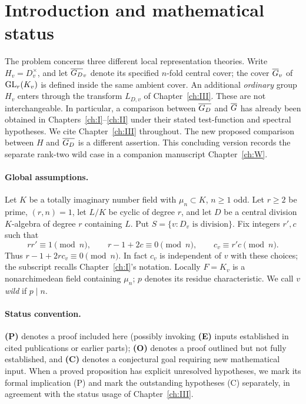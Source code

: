 \section{Introduction and mathematical status}\label{IV:sec:intro}
The problem concerns three different local representation theories.
Write $H_v=D_v^\times$, and let $\overline{G_D}_v$ denote its specified $n$-fold
central cover; the cover $\overline G_v$ of $\operatorname{GL}_r(K_v)$ is defined inside the
same ambient cover.  An additional \emph{ordinary} group $H_v$ enters
through the transform $L_{D,v}$ of Chapter~\ref{ch:III}.  These are not interchangeable.
In particular, a comparison between $\overline{G_D}$ and $\overline G$ has already been
obtained in Chapters~\ref{ch:I}--\ref{ch:II} under their
stated test-function and spectral hypotheses.  We cite Chapter~\ref{ch:III} throughout.  The new proposed comparison between $H$ and $\overline{G_D}$ is a
different assertion.  This concluding version records the separate
rank-two wild case in a companion manuscript Chapter~\ref{ch:W}.

\paragraph{Global assumptions.}
Let $K$ be a totally imaginary number field with $\mu_n\subset K$,
$n\geq1$ odd.  Let $r\geq2$ be prime, $(r,n)=1$, let $L/K$ be cyclic
of degree $r$, and let $D$ be a central division $K$-algebra of
degree $r$ containing $L$.  Put $S=\{v:D_v\text{ is division}\}$.
Fix integers $r',c$ such that
\begin{equation}\label{IV:eq:parameters}
 rr'\equiv1\pmod n,\qquad r-1+2c\equiv0\pmod n,
 \qquad c_v\equiv r'c\pmod n.
\end{equation}
Thus $r-1+2rc_v\equiv0\pmod n$.  In fact $c_v$ is independent
of $v$ with these choices; the subscript recalls Chapter~\ref{ch:I}'s notation.
Locally $F=K_v$ is a nonarchimedean field containing $\mu_n$;
$p$ denotes its residue characteristic.  We call $v$ \emph{wild}
if $p\mid n$.

\paragraph{Status convention.}
\textbf{(P)} denotes a proof included here (possibly invoking
\textbf{(E)} inputs established in cited publications or earlier parts);
\textbf{(O)} denotes a proof outlined but not fully established, and
\textbf{(C)} denotes a conjectural goal requiring new mathematical
input.  When a proved proposition has explicit unresolved hypotheses,
we mark its formal implication (P) and mark the outstanding hypotheses
(C) separately, in agreement with the status usage of Chapter~\ref{ch:III}.

